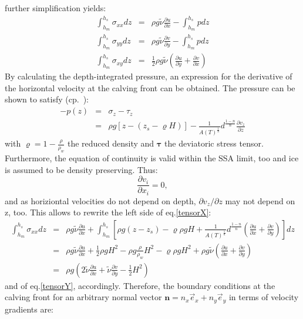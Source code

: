 \documentclass[a4paper,10pt]{article}
\begin{document}
further simplification yields:
\begin{eqnarray}%
\int_{h_m}^{h_s}\sigma_{xx}dz & = &
\rho g\tilde{\nu} \frac{\partial u}{\partial x} - \int_{h_m}^{h_s}p dz \label{tensorX}\\
\int_{h_m}^{h_s}\sigma_{yy}dz & = &
\rho g\tilde{\nu} \frac{\partial v}{\partial y} - \int_{h_m}^{h_s}p dz \label{tensorY}\\
\int_{h_m}^{h_s}\sigma_{xy}dz & = &
\frac{1}{2} \rho g\tilde{\nu} \left(\frac{\partial u}{\partial y}+\frac{\partial v}{\partial x} \right) \label{tensorXY}
\end{eqnarray}
By calculating the depth-integrated pressure, an expression for the derivative of the horizontal velocity at the calving front can be obtained. The pressure can be shown to satisfy (cp.~\cite{Weis01}):
\begin{eqnarray*}
-p(z) & = & \sigma_z - \tau_z \\
      & = & \rho g\left[z-\left(z_s-\varrho H\right)\right] -\frac{1}{A(T)^\frac{1}{n}}d^\frac{1-n}{n}\frac{\partial v_z}{\partial z}
\end{eqnarray*}
with $\varrho=1-\frac{\rho}{\rho_w}$ the reduced density and $\mathbf{\tau}$ the deviatoric stress tensor.  Furthermore, the equation of continuity is valid within the SSA limit, too and ice is assumed to be density preserving. Thus:
\begin{equation*}
\frac{\partial v_i}{\partial x_i} = 0,
\end{equation*}
and as horiziontal velocities do not depend on depth, $\partial v_z/ \partial
z$ may not depend on z, too. This allows to rewrite the left side of eq.\eqref{tensorX}:
\begin{eqnarray*}
\int_{h_m}^{h_s}\sigma_{xx}dz & = & \rho g\tilde{\nu} \frac{\partial u}{\partial x} + \int_{h_m}^{h_s} \left[ \rho g(z-z_s) - \varrho\rho gH+\frac{1}{A(T)^\frac{1}{n}}d^\frac{1-n}{n} \left( \frac{\partial u}{\partial x}+\frac{\partial v}{\partial y} \right) \right] dz \\
& = & \rho g\tilde{\nu} \frac{\partial u}{\partial x} +  \frac{1}{2}\rho gH^2 - \rho g \frac{\rho}{\rho_w}H^2 -\varrho\rho gH^2+\rho g \tilde{\nu}\left( \frac{\partial u}{\partial x} + \frac{\partial v}{\partial y} \right) \\
& = & \rho g \left(2\tilde{\nu}\frac{\partial u}{\partial x} + \tilde{\nu}\frac{\partial v}{\partial y} - \frac{1}{2}H^2   \right)
\end{eqnarray*}
and of eq.\eqref{tensorY}, accordingly. Therefore, the boundary conditions at the calving front for an arbitrary normal vector $\mathbf{n}=n_x\overrightarrow{e}_x+n_y\overrightarrow{e}_y$ in terms of velocity gradients are:
\end{document}
